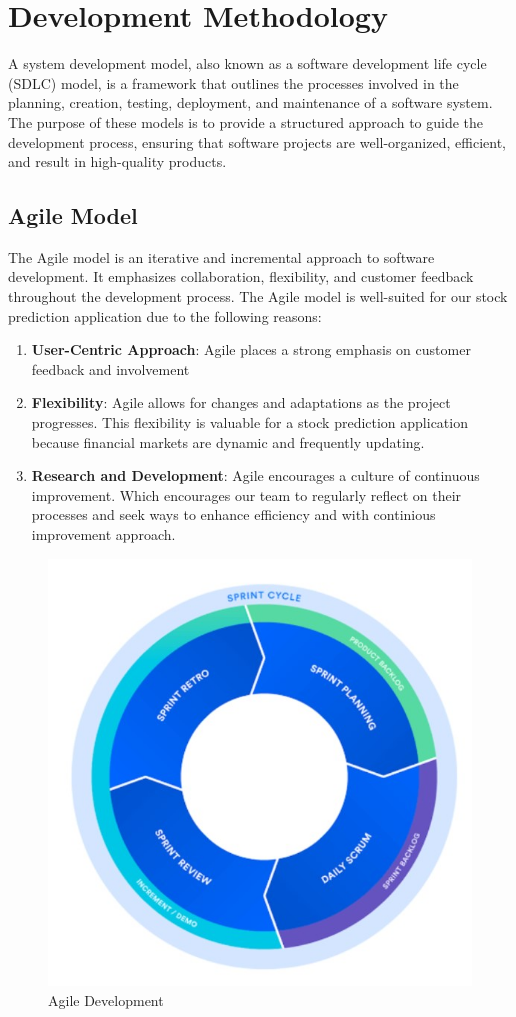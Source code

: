 \documentclass[./main.tex]{subfiles}
\begin{document}
\section{Development Methodology}
A system development model, also known as a software development life cycle (SDLC) model, is a framework that outlines the processes involved in the planning, creation, testing, deployment, and maintenance of a software system. The purpose of these models is to provide a structured approach to guide the development process, ensuring that software projects are well-organized, efficient, and result in high-quality products.
\subsection{Agile Model}
The Agile model is an iterative and incremental approach to software development. It emphasizes collaboration, flexibility, and customer feedback throughout the development process.
The Agile model is well-suited for our stock prediction application due to the following reasons:
\begin{enumerate}[label=\textasteriskcentered]
\item \textbf{User-Centric Approach}: Agile places a strong emphasis on customer feedback and involvement
  \item   \textbf{Flexibility}: Agile allows for changes and adaptations as the project progresses. This flexibility is valuable for a stock prediction application because financial markets are dynamic and frequently updating.
  \item \textbf{Research and Development}: Agile encourages a culture of continuous improvement. Which encourages our team to regularly reflect on their processes and seek ways to enhance efficiency and  with continious improvement approach.\cite{boehm2007survey}
 
\end{enumerate}
 \begin{figure}[H]
     \centering
     \includegraphics[width=0.75\linewidth]{images/Diagram-or-visual-representation-of-a-Scrum-sprint.jpg}
     \caption{Agile Development}
     \label{fig:3.1}
 \end{figure}
\end{document}
